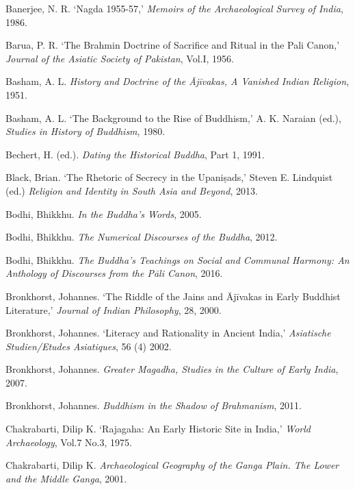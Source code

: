 \label{footprints_split_022.html_Banerjeeux201986}
Banerjee, N. R. `Nagda 1955-57,' \emph{Memoirs of the Archaeological
Survey of India}, 1986.

Barua, P. R. `The Brahmin Doctrine of Sacrifice and Ritual in the Pali
Canon,' \emph{Journal of the Asiatic Society of Pakistan}, Vol.I, 1956.

\label{footprints_split_022.html_Bashamux201951}
Basham, A. L. \emph{History and Doctrine of the Ājīvakas, A Vanished
Indian Religion}, 1951.

Basham, A. L. `The Background to the Rise of Buddhism,' A. K. Naraian
(ed.), \emph{Studies in History of Buddhism}, 1980.

Bechert, H. (ed.). \emph{Dating the Historical Buddha}, Part 1, 1991.

\label{footprints_split_022.html_Blackux202013}
Black, Brian. `The Rhetoric of Secrecy in the Upaniṣads,' Steven E.
Lindquist (ed.) \emph{Religion and Identity in South Asia and Beyond},
2013.

\label{footprints_split_022.html_Bodhiux202005}
Bodhi, Bhikkhu. \emph{In the Buddha's Words}, 2005.

\label{footprints_split_022.html_Bodhiux202012}
Bodhi, Bhikkhu. \emph{The Numerical Discourses of the Buddha}, 2012.

Bodhi, Bhikkhu. \emph{The Buddha's Teachings on Social and Communal
Harmony: An Anthology of Discourses from the Pāli Canon}, 2016.

Bronkhorst, Johannes. `The Riddle of the Jains and Ājīvakas in Early
Buddhist Literature,' \emph{Journal of Indian Philosophy}, 28, 2000.

\label{footprints_split_022.html_Bronkhorstux202002}
Bronkhorst, Johannes. `Literacy and Rationality in Ancient India,'
\emph{Asiatische Studien/Etudes Asiatiques}, 56 (4) 2002.

\label{footprints_split_022.html_Bronkhorstux202007}
Bronkhorst, Johannes. \emph{Greater Magadha, Studies in the Culture of
Early India}, 2007.

\label{footprints_split_022.html_Bronkhorstux202011}
Bronkhorst, Johannes. \emph{Buddhism in the Shadow of Brahmanism}, 2011.

Chakrabarti, Dilip K. `Rajagaha: An Early Historic Site in India,'
\emph{World Archaeology}, Vol.7 No.3, 1975.

\label{footprints_split_022.html_Chakrabartiux202001}
Chakrabarti, Dilip K. \emph{Archaeological Geography of the Ganga Plain.
The Lower and the Middle Ganga}, 2001.


